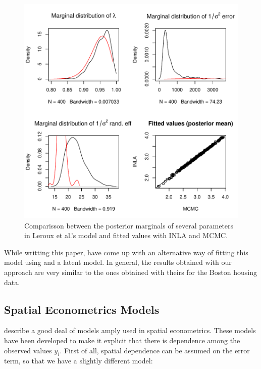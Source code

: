 \documentclass[article]{jss}
\begin{document}
\begin{figure}[h]
\begin{center}
\includegraphics{spatial_inla-027}
\end{center}
\caption{Comparisson between the posterior marginals of several parameters in 
Leroux et al.'s model and fitted values with INLA and MCMC.}
\label{fig:leroux}
\end{figure}

While writting this paper, \citet{LeeMitchell:2013} have come up with an
alternative way of fitting this model using  and a 
latent model. In general, the results obtained with our approach are very
similar to the ones obtained with theirs for the Boston housing data.








\subsection{Spatial Econometrics Models}

\citet{LeSagePace:2009} describe a good deal of models amply used in spatial
econometrics. These models have been developed to make it explicit that there
is dependence among the observed values $y_i$. First of all, spatial dependence
can be assumed on the error term, so that we have a slightly different model:
\end{document}
